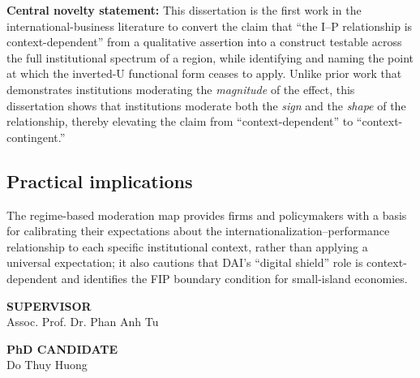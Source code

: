 \documentclass[
  a4paper,
  13pt]{extarticle}
\begin{document}
\textbf{Central novelty statement:} This dissertation is the first work
in the international-business literature to convert the claim that ``the
I--P relationship is context-dependent'' from a qualitative assertion
into a construct testable across the full institutional spectrum of a
region, while identifying and naming the point at which the inverted-U
functional form ceases to apply. Unlike prior work that demonstrates
institutions moderating the \emph{magnitude} of the effect, this
dissertation shows that institutions moderate both the \emph{sign} and
the \emph{shape} of the relationship, thereby elevating the claim from
``context-dependent'' to ``context-contingent.''

\hypertarget{practical-implications}{%
\subsection*{Practical implications}\label{practical-implications}}

The regime-based moderation map provides firms and policymakers with a
basis for calibrating their expectations about the
internationalization--performance relationship to each specific
institutional context, rather than applying a universal expectation; it
also cautions that DAI's ``digital shield'' role is context-dependent
and identifies the FIP boundary condition for small-island economies.

\vspace{1.4cm}

\noindent\begin{minipage}[t]{0.48\textwidth}\centering \textbf{SUPERVISOR}\\[2.2cm]Assoc. Prof. Dr. Phan Anh Tu\end{minipage}\hfill\begin{minipage}[t]{0.48\textwidth}\centering \textbf{PhD CANDIDATE}\\[2.2cm]Do Thuy Huong\end{minipage}
\end{document}
